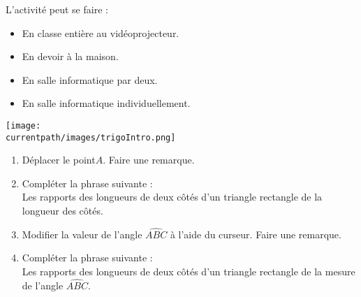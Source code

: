 \begin{changemargin}{-10mm}{-10mm}
\begin{activite}
    \begin{minipage}{0.6\linewidth}
        \begin{remarque}
            L'activité peut se faire :
            \begin{itemize}
                \item En classe entière au vidéoprojecteur.
                \item En devoir à la maison.
                \item En salle informatique par deux.
                \item En salle informatique individuellement.
            \end{itemize}
        \end{remarque}
    \end{minipage}
    \begin{minipage}{0.35\linewidth}
        \begin{center}
            \texttt{[image: \\currentpath/images/trigoIntro.png]}
        \end{center}
    \end{minipage}
    \begin{center}
        {\Huge {}}    
        
    \end{center}
    \begin{enumerate}
        \item Déplacer le point$A$. Faire une remarque.
        \par\medskip
        \pointilles\par\medskip
        \pointilles\par\medskip
        \pointilles\par\medskip
        \pointilles
        \item Compléter la phrase suivante :\\
        Les rapports des longueurs de deux côtés d'un triangle rectangle \pointilles[0.3\linewidth] de la longueur des côtés.
        \item Modifier la valeur de l'angle $\widehat{ABC}$ à l'aide du curseur. Faire une remarque.
        \par\medskip
        \pointilles\par\medskip
        \pointilles\par\medskip
        \pointilles\par\medskip
        \pointilles\par\medskip        
        \item Compléter la phrase suivante :\\
        Les rapports des longueurs de deux côtés d'un triangle rectangle \pointilles[0.3\linewidth] de la mesure de l'angle $\widehat{ABC}$.
    \end{enumerate}


\end{activite}
\end{changemargin}
